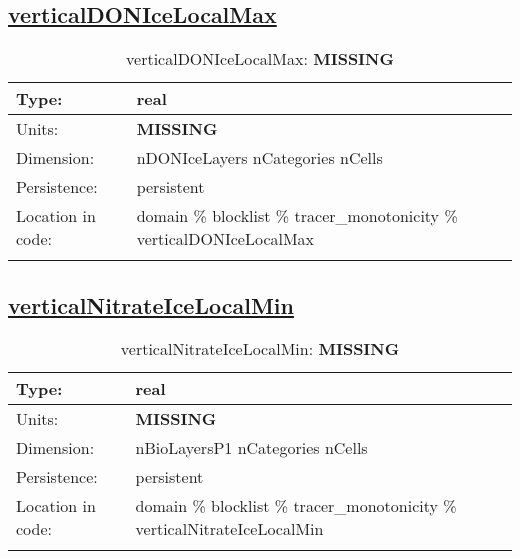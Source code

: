 \subsection[verticalDONIceLocalMax]{\hyperref[sec:var_tab_tracer_monotonicity]{verticalDONIceLocalMax}}
\label{subsec:var_sec_tracer_monotonicity_verticalDONIceLocalMax}
\begin{center}
\begin{longtable}{| p{2.0in} | p{4.0in} |}
        \hline 
        Type: & real \\
        \hline 
        Units: & {\bf \color{red} MISSING} \\
        \hline 
        Dimension: & nDONIceLayers nCategories nCells \\
        \hline 
        Persistence: & persistent \\
        \hline 
         Location in code: & domain \% blocklist \% tracer\_monotonicity \% verticalDONIceLocalMax \\
         \hline 
    \caption{verticalDONIceLocalMax: {\bf \color{red} MISSING}}
\end{longtable}
\end{center}
\subsection[verticalNitrateIceLocalMin]{\hyperref[sec:var_tab_tracer_monotonicity]{verticalNitrateIceLocalMin}}
\label{subsec:var_sec_tracer_monotonicity_verticalNitrateIceLocalMin}
\begin{center}
\begin{longtable}{| p{2.0in} | p{4.0in} |}
        \hline 
        Type: & real \\
        \hline 
        Units: & {\bf \color{red} MISSING} \\
        \hline 
        Dimension: & nBioLayersP1 nCategories nCells \\
        \hline 
        Persistence: & persistent \\
        \hline 
         Location in code: & domain \% blocklist \% tracer\_monotonicity \% verticalNitrateIceLocalMin \\
         \hline 
    \caption{verticalNitrateIceLocalMin: {\bf \color{red} MISSING}}
\end{longtable}
\end{center}
